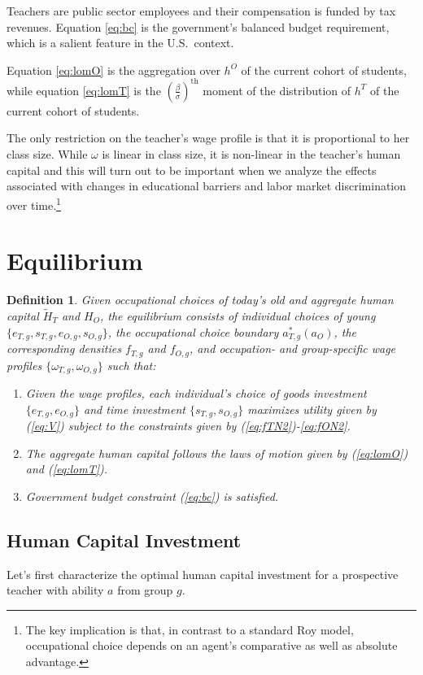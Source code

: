 \documentclass[onehalfspacing,11pt]{article}
\newtheorem{df}{Definition}
\begin{document}
Teachers are public sector employees and their compensation is funded by tax revenues. Equation \eqref{eq:bc} is the government's balanced budget requirement, which is a salient feature in the U.S.~context. 

Equation \eqref{eq:lomO} is the aggregation over $h^O$ of the current cohort of students, while equation \eqref{eq:lomT} is the ${\left( \tfrac{\beta}{\sigma} \right)}^{\textrm{th}}$ moment of the distribution of $h^T$ of the current cohort of students.

The only restriction on the teacher's wage profile is that it is proportional to her class size. While $\omega$ is linear in class size, it is non-linear in the teacher's human capital and this will turn out to be important when we analyze the effects associated with changes in educational barriers and labor market discrimination over time.\footnote{The key implication is that, in contrast to a standard Roy model, occupational choice depends on an agent's comparative as well as absolute advantage.}

\section{Equilibrium}
\begin{df}
Given occupational choices of today's old and aggregate human capital $\widetilde{H}_{T}$ and ${H}_{O}$, the equilibrium consists of individual choices of young $\{e_{T,g}, s_{T,g}, e_{O,g}, s_{O,g}\}$, the occupational choice boundary $a^*_{T,g}(a_O)$, the corresponding densities $f_{T,g}$ and $f_{O,g}$, and occupation- and group-specific wage profiles $\{\omega_{T,g}, \omega_{O,g}\}$ such that:
\begin{enumerate}
  \item Given the wage profiles, each individual's choice of goods investment $\{e_{T,g}, e_{O,g}\}$ and time investment $\{s_{T,g}, s_{O,g}\}$ maximizes utility given by (\ref{eq:V}) subject to the constraints given by (\ref{eq:fTN2})-\eqref{eq:fON2}.
  \item The aggregate human capital follows the laws of motion given by (\ref{eq:lomO}) and (\ref{eq:lomT}).
  \item Government budget constraint (\ref{eq:bc}) is satisfied.
\end{enumerate}
\end{df}

\subsection{Human Capital Investment}
Let's first characterize the optimal human capital investment for a prospective teacher with ability $a$ from group $g$.%
\end{document}
